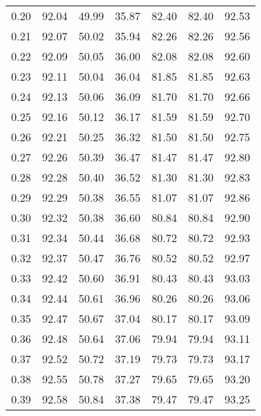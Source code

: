 \begin{tabular}{|c|c|c|c|c|c|c|}
      0.20 &     92.04 &     49.99 &      35.87 &   82.40 &      82.40 &         92.53 \\
      0.21 &     92.07 &     50.02 &      35.94 &   82.26 &      82.26 &         92.56 \\
      0.22 &     92.09 &     50.05 &      36.00 &   82.08 &      82.08 &         92.60 \\
      0.23 &     92.11 &     50.04 &      36.04 &   81.85 &      81.85 &         92.63 \\
      0.24 &     92.13 &     50.06 &      36.09 &   81.70 &      81.70 &         92.66 \\
      0.25 &     92.16 &     50.12 &      36.17 &   81.59 &      81.59 &         92.70 \\
      0.26 &     92.21 &     50.25 &      36.32 &   81.50 &      81.50 &         92.75 \\
      0.27 &     92.26 &     50.39 &      36.47 &   81.47 &      81.47 &         92.80 \\
      0.28 &     92.28 &     50.40 &      36.52 &   81.30 &      81.30 &         92.83 \\
      0.29 &     92.29 &     50.38 &      36.55 &   81.07 &      81.07 &         92.86 \\
      0.30 &     92.32 &     50.38 &      36.60 &   80.84 &      80.84 &         92.90 \\
      0.31 &     92.34 &     50.44 &      36.68 &   80.72 &      80.72 &         92.93 \\
      0.32 &     92.37 &     50.47 &      36.76 &   80.52 &      80.52 &         92.97 \\
      0.33 &     92.42 &     50.60 &      36.91 &   80.43 &      80.43 &         93.03 \\
      0.34 &     92.44 &     50.61 &      36.96 &   80.26 &      80.26 &         93.06 \\
      0.35 &     92.47 &     50.67 &      37.04 &   80.17 &      80.17 &         93.09 \\
      0.36 &     92.48 &     50.64 &      37.06 &   79.94 &      79.94 &         93.11 \\
      0.37 &     92.52 &     50.72 &      37.19 &   79.73 &      79.73 &         93.17 \\
      0.38 &     92.55 &     50.78 &      37.27 &   79.65 &      79.65 &         93.20 \\
      0.39 &     92.58 &     50.84 &      37.38 &   79.47 &      79.47 &         93.25 \\

\end{tabular}
